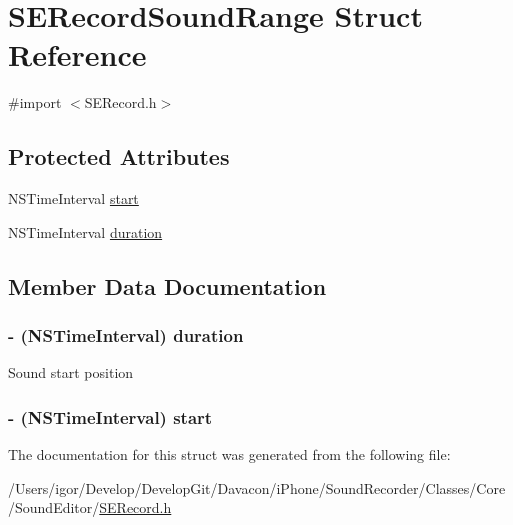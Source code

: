 \hypertarget{struct_s_e_record_sound_range}{\section{S\-E\-Record\-Sound\-Range Struct Reference}
\label{struct_s_e_record_sound_range}
}


{\ttfamily \#import $<$S\-E\-Record.\-h$>$}

\subsection*{Protected Attributes}
\begin{DoxyCompactItemize}
\item 
N\-S\-Time\-Interval \hyperlink{struct_s_e_record_sound_range_a68e4b0862e4a25d22219776f0a9d4bc9}{start}
\item 
N\-S\-Time\-Interval \hyperlink{struct_s_e_record_sound_range_a9c2cd7852875423d8bde9118fd62f85b}{duration}
\end{DoxyCompactItemize}


\subsection{Member Data Documentation}
\hypertarget{struct_s_e_record_sound_range_a9c2cd7852875423d8bde9118fd62f85b}{
\subsubsection[{duration}]{\setlength{\rightskip}{0pt plus 5cm}-\/ (N\-S\-Time\-Interval) duration\hspace{0.3cm}{\ttfamily [protected]}}}\label{struct_s_e_record_sound_range_a9c2cd7852875423d8bde9118fd62f85b}
Sound start position \hypertarget{struct_s_e_record_sound_range_a68e4b0862e4a25d22219776f0a9d4bc9}{
\subsubsection[{start}]{\setlength{\rightskip}{0pt plus 5cm}-\/ (N\-S\-Time\-Interval) start\hspace{0.3cm}{\ttfamily [protected]}}}\label{struct_s_e_record_sound_range_a68e4b0862e4a25d22219776f0a9d4bc9}


The documentation for this struct was generated from the following file\-:\begin{DoxyCompactItemize}
\item 
/\-Users/igor/\-Develop/\-Develop\-Git/\-Davacon/i\-Phone/\-Sound\-Recorder/\-Classes/\-Core/\-Sound\-Editor/\hyperlink{_s_e_record_8h}{S\-E\-Record.\-h}\end{DoxyCompactItemize}
